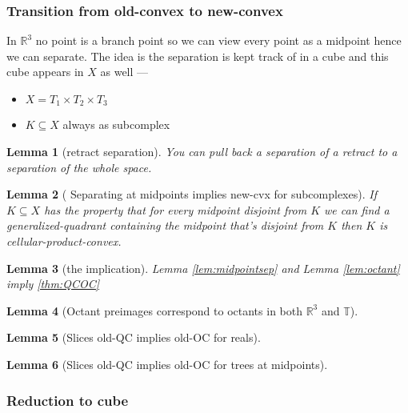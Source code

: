 \documentclass{article}
\theoremstyle{mystyle}
\newtheorem{lem}{Lemma}[section]
\theoremstyle{remark}
\begin{document}
\subsubsection{Transition from old-convex to new-convex}

In \(\mathbb{R}^{3} \) no point is a branch point so we can view every point as a midpoint hence we can separate. The idea is the separation is kept track of in a cube and this cube appears in \(X\) as well --- 

\begin{itemize}
	\item \(X=T_{1} \times T_{2} \times T_{3}\)
	\item \(K \subseteq X\) always as subcomplex
\end{itemize}

\begin{lem}
    [retract separation]
    You can pull back a separation of a retract to a separation of the whole space.
\end{lem}
\begin{lem}
	[\label{lem:midpointsep} Separating at midpoints implies new-cvx for subcomplexes]
	If \(K \subseteq X \) has the property that for every midpoint disjoint from \(K\) we can find a generalized-quadrant containing the midpoint that's disjoint from \(K\) then \(K\) is cellular-product-convex.
\end{lem}
\begin{lem}
	[the implication]
	Lemma \ref{lem:midpointsep} and Lemma \ref{lem:octant} imply \ref{thm:QCOC}
\end{lem}
\begin{lem}
	[\label{lem:octant}Octant preimages correspond to octants in both \(\mathbb{R}^3\) and \(\mathbb{T}\)]
\end{lem}
\begin{lem}
    [Slices old-QC implies old-OC for reals]


\end{lem}
\begin{lem}
    [Slices old-QC implies old-OC for trees at midpoints]
\end{lem}

\subsubsection{Reduction to cube}
\end{document}
